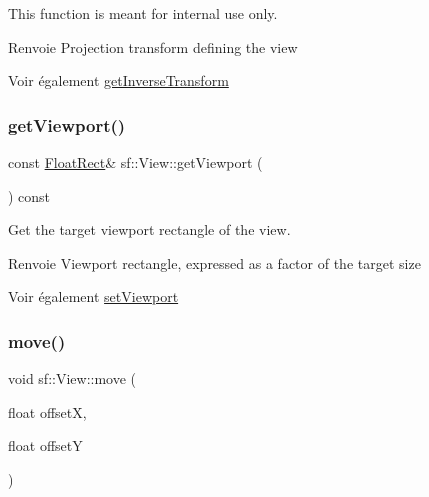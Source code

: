 This function is meant for internal use only.

\begin{DoxyReturn}{Renvoie}
Projection transform defining the view
\end{DoxyReturn}
\begin{DoxySeeAlso}{Voir également}
\hyperlink{classsf_1_1View_acd2b001cf2a646f62e7d9e792d7d5f0d}{get\+Inverse\+Transform} 
\end{DoxySeeAlso}
\mbox{\label{classsf_1_1View_a93859b4e2e8c191ec741731211a0fb12}} 
\subsubsection{\texorpdfstring{get\+Viewport()}{getViewport()}}
{\footnotesize\ttfamily const \hyperlink{classsf_1_1Rect}{Float\+Rect}\& sf\+::\+View\+::get\+Viewport (\begin{DoxyParamCaption}{ }\end{DoxyParamCaption}) const}



Get the target viewport rectangle of the view. 

\begin{DoxyReturn}{Renvoie}
Viewport rectangle, expressed as a factor of the target size
\end{DoxyReturn}
\begin{DoxySeeAlso}{Voir également}
\hyperlink{classsf_1_1View_a8eaec46b7d332fe834f016d0187d4b4a}{set\+Viewport} 
\end{DoxySeeAlso}
\mbox{\label{classsf_1_1View_a0c82144b837caf812f7cb25a43d80c41}} 
\subsubsection{\texorpdfstring{move()}{move()}\hspace{0.1cm}{\footnotesize\ttfamily [1/2]}}
{\footnotesize\ttfamily void sf\+::\+View\+::move (\begin{DoxyParamCaption}\item[{float}]{offsetX,  }\item[{float}]{offsetY }\end{DoxyParamCaption})}



